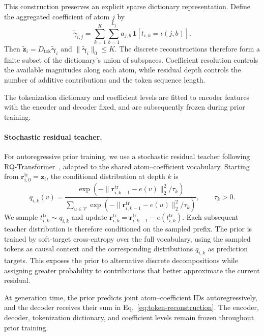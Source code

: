 This construction preserves an explicit sparse dictionary representation. Define the aggregated coefficient of atom $j$ by
\begin{equation}
    \widetilde{\gamma}_{i,j}
    =\sum_{k=1}^{K}\sum_{b=1}^{L_j}
      a_{j,b}\,
      \mathbf{1}\!\left[t_{i,k}=\iota(j,b)\right].
\end{equation}
Then $\widetilde{\boldsymbol{z}}_i=D_{\mathrm{tok}}\widetilde{\boldsymbol{\gamma}}_i$ and $\|\widetilde{\boldsymbol{\gamma}}_i\|_0\leq K$. The discrete reconstructions therefore form a finite subset of the dictionary's union of subspaces. Coefficient resolution controls the available magnitudes along each atom, while residual depth controls the number of additive contributions and the token sequence length.

The tokenization dictionary and coefficient levels are fitted to encoder features with the encoder and decoder fixed, and are subsequently frozen during prior training.

\paragraph{Stochastic residual teacher.}
For autoregressive prior training, we use a stochastic residual teacher following RQ-Transformer~\citep{lee2022rqvae}, adapted to the shared atom--coefficient vocabulary. Starting from $\boldsymbol{r}^{\mathrm{tr}}_{i,0}=\boldsymbol{z}_i$, the conditional distribution at depth $k$ is
\begin{equation}
    q_{i,k}(v)=\frac{\exp\!\left(-\|\boldsymbol{r}^{\mathrm{tr}}_{i,k-1}-e(v)\|_2^2/\tau_k\right)}{\sum_{u\in\mathcal{V}}\exp\!\left(-\|\boldsymbol{r}^{\mathrm{tr}}_{i,k-1}-e(u)\|_2^2/\tau_k\right)},
    \qquad \tau_k>0.
    \label{eq:token-soft-target}
\end{equation}
We sample $t^{\mathrm{tr}}_{i,k}\sim q_{i,k}$ and update $\boldsymbol{r}^{\mathrm{tr}}_{i,k}=\boldsymbol{r}^{\mathrm{tr}}_{i,k-1}-e(t^{\mathrm{tr}}_{i,k})$. Each subsequent teacher distribution is therefore conditioned on the sampled prefix. The prior is trained by soft-target cross-entropy over the full vocabulary, using the sampled tokens as causal context and the corresponding distributions $q_{i,k}$ as prediction targets. This exposes the prior to alternative discrete decompositions while assigning greater probability to contributions that better approximate the current residual.

At generation time, the prior predicts joint atom--coefficient IDs autoregressively, and the decoder receives their sum in Eq.~\eqref{eq:token-reconstruction}. The encoder, decoder, tokenization dictionary, and coefficient levels remain frozen throughout prior training.
